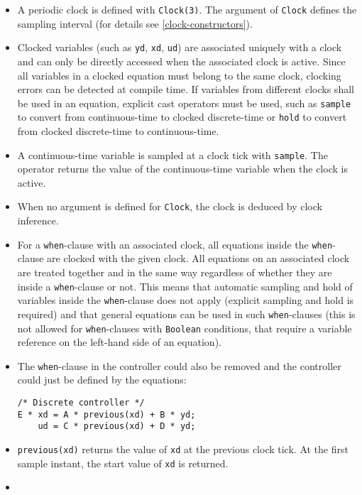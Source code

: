 \begin{itemize}
\item
  A periodic clock is defined with \lstinline!Clock(3)!.
  The argument of \lstinline!Clock! defines the sampling interval (for details see \cref{clock-constructors}).
\item
  Clocked variables (such as \lstinline!yd!, \lstinline!xd!, \lstinline!ud!) are associated uniquely with a clock and can only be directly accessed when the associated clock is active.
  Since all variables in a clocked equation must belong to the same clock, clocking errors can be detected at compile time.
  If variables from different clocks shall be used in an equation, explicit cast operators must be used, such as \lstinline!sample! to convert from continuous-time to clocked discrete-time or \lstinline!hold! to convert from clocked discrete-time to continuous-time.
\item
  A continuous-time variable is sampled at a clock tick with \lstinline!sample!.
  The operator returns the value of the continuous-time variable when the clock is active.
\item
  When no argument is defined for \lstinline!Clock!, the clock is deduced by clock inference.
\item
  For a \lstinline!when!-clause with an associated clock, all equations inside the \lstinline!when!-clause are clocked with the given clock.
  All equations on an associated clock are treated together and in the same way regardless of whether they are inside a \lstinline!when!-clause or not.
  This means that automatic sampling and hold of variables inside the \lstinline!when!-clause does not apply (explicit sampling and hold is required) and that general equations can be used in such \lstinline!when!-clauses (this is not allowed for \lstinline!when!-clauses with \lstinline!Boolean! conditions, that require a variable reference on the left-hand side of an equation).
\item
  The \lstinline!when!-clause in the controller could also be removed and the controller could just be defined by the equations:
\begin{lstlisting}[language=modelica]
/* Discrete controller */
E * xd = A * previous(xd) + B * yd;
    ud = C * previous(xd) + D * yd;
\end{lstlisting}
\item
  \lstinline!previous(xd)! returns the value of \lstinline!xd! at the previous clock tick.
  At the first sample instant, the start value of \lstinline!xd! is returned.
\item

\end{itemize}
